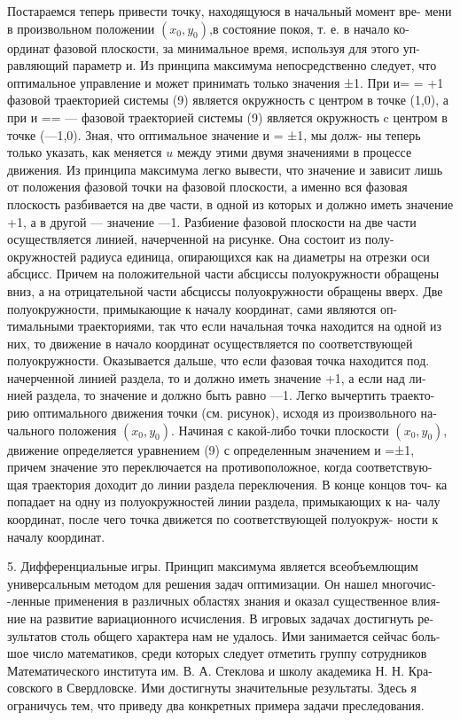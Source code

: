 \documentclass[10pt]{article}
\begin{document}
Постараемся теперь привести точку, находящуюся в начальный момент вре- мени в произвольном положении \(\left( {{x}_{0},{y}_{0}}\right)\),в состояние покоя, т. е. в начало ко- ординат фазовой плоскости, за минимальное время, используя для этого уп- равляющий параметр и. Из принципа максимума непосредственно следует, что оптимальное управление и может принимать только значения ±1. При и= = +1 фазовой траекторией системы (9) является окружность с центром в точке (1,0), а при и == — фазовой траекторией системы (9) является окружность c центром в точке (—1,0). Зная, что оптимальное значение и = ±1, мы долж- ны теперь только указать, как меняется \(u\) между этими двумя значениями в процессе движения. Из принципа максимума легко вывести, что значение и зависит лишь от положения фазовой точки на фазовой плоскости, а именно вся фазовая плоскость разбивается на две части, в одной из которых и должно иметь значение +1, а в другой — значение —1. Разбиение фазовой плоскости на две части осуществляется линией, начерченной на рисунке. Она состоит из полу- окружностей радиуса единица, опирающихся как на диаметры на отрезки оси абсцисс. Причем на положительной части абсциссы полуокружности обращены вниз, а на отрицательной части абсциссы полуокружности обращены вверх. Две полуокружности, примыкающие к началу координат, сами являются оп- тимальными траекториями, так что если начальная точка находится на одной из них, то движение в начало координат осуществляется по соответствующей полуокружности. Оказывается дальше, что если фазовая точка находится под. начерченной линией раздела, то и должно иметь значение +1, а если над ли- нией раздела, то значение и должно быть равно —1. Легко вычертить траекто- рию оптимального движения точки (см. рисунок), исходя из произвольного на- чального положения \(\left( {{x}_{0},{y}_{0}}\right)\). Начиная с какой-либо точки плоскости \(\left( {{x}_{0},{y}_{0}}\right)\), движение определяется уравнением (9) с определенным значением и =±1, причем значение это переключается на противоположное, когда соответствую- щая траектория доходит до линии раздела переключения. В конце концов точ- ка попадает на одну из полуокружностей линии раздела, примыкающих к на- чалу координат, после чего точка движется по соответствующей полуокруж- ности к началу координат.

5. Дифференциальные игры. Принцип максимума является всеобъемлющим универсальным методом для решения задач оптимизации. Он нашел многочис- -ленные применения в различных областях знания и оказал существенное влия- ние на развитие вариационного исчисления. В игровых задачах достигнуть ре- зультатов столь общего характера нам не удалось. Ими занимается сейчас боль- шое число математиков, среди которых следует отметить группу сотрудников Математического института им. В. А. Стеклова и школу академика Н. Н. Кра- совского в Свердловске. Ими достигнуты значительные результаты. Здесь я ограничусь тем, что приведу два конкретных примера задачи преследования.
\end{document}
